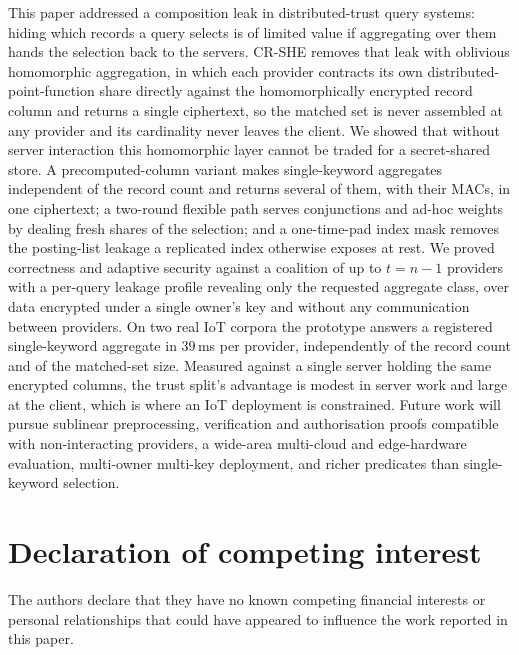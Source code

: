 \documentclass[a4paper,fleqn]{cas-dc}
\begin{document}
This paper addressed a composition leak in distributed-trust query systems:
hiding which records a query selects is of limited value if aggregating over
them hands the selection back to the servers. CR-SHE removes that leak with
oblivious homomorphic aggregation, in which each provider contracts its own
distributed-point-function share directly against the homomorphically
encrypted record column and returns a single ciphertext, so the matched set is
never assembled at any provider and its cardinality never leaves the client.
We showed that without server interaction this homomorphic layer cannot be
traded for a secret-shared store. A precomputed-column variant makes
single-keyword aggregates independent of the record count and returns several
of them, with their MACs, in one ciphertext; a two-round flexible path serves
conjunctions and ad-hoc weights by dealing fresh shares of the selection; and
a one-time-pad index mask removes the posting-list leakage a replicated index
otherwise exposes at rest.
We proved correctness and adaptive security against a coalition of up to
$t=n-1$ providers with a per-query leakage profile revealing only the
requested aggregate class, over data encrypted under a single owner's key and
without any communication between providers. On two real IoT corpora the
prototype answers a registered single-keyword aggregate in $39$\,ms per
provider, independently of the record count and of the matched-set size.
Measured against a single server holding the same encrypted columns, the
trust split's advantage is modest in server work and large at the client,
which is where an IoT deployment is constrained. Future work will pursue sublinear
preprocessing, verification and authorisation proofs compatible with
non-interacting providers, a wide-area multi-cloud and edge-hardware
evaluation, multi-owner multi-key deployment, and richer predicates than
single-keyword selection.

\printcredits

\section*{Declaration of competing interest}
The authors declare that they have no known competing financial interests or
personal relationships that could have appeared to influence the work reported
in this paper.
\end{document}
